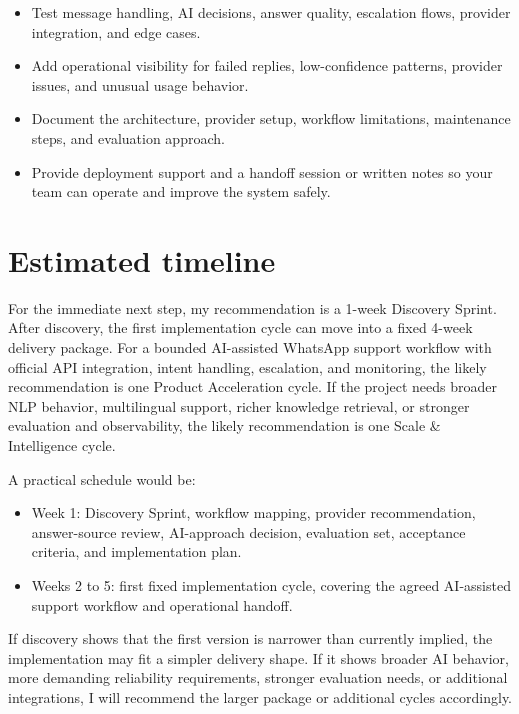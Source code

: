 \documentclass[11pt,a4paper]{article}
\begin{document}
\begin{itemize}
\item Test message handling, AI decisions, answer quality, escalation flows, provider integration, and edge cases.
\item Add operational visibility for failed replies, low-confidence patterns, provider issues, and unusual usage behavior.
\item Document the architecture, provider setup, workflow limitations, maintenance steps, and evaluation approach.
\item Provide deployment support and a handoff session or written notes so your team can operate and improve the system safely.
\end{itemize}

\section*{Estimated timeline}

For the immediate next step, my recommendation is a 1-week Discovery Sprint. After discovery, the first implementation cycle can move into a fixed 4-week delivery package. For a bounded AI-assisted WhatsApp support workflow with official API integration, intent handling, escalation, and monitoring, the likely recommendation is one Product Acceleration cycle. If the project needs broader NLP behavior, multilingual support, richer knowledge retrieval, or stronger evaluation and observability, the likely recommendation is one Scale \& Intelligence cycle.\par

A practical schedule would be:\par

\begin{itemize}
\item Week 1: Discovery Sprint, workflow mapping, provider recommendation, answer-source review, AI-approach decision, evaluation set, acceptance criteria, and implementation plan.
\item Weeks 2 to 5: first fixed implementation cycle, covering the agreed AI-assisted support workflow and operational handoff.
\end{itemize}

If discovery shows that the first version is narrower than currently implied, the implementation may fit a simpler delivery shape. If it shows broader AI behavior, more demanding reliability requirements, stronger evaluation needs, or additional integrations, I will recommend the larger package or additional cycles accordingly.\par
\end{document}
